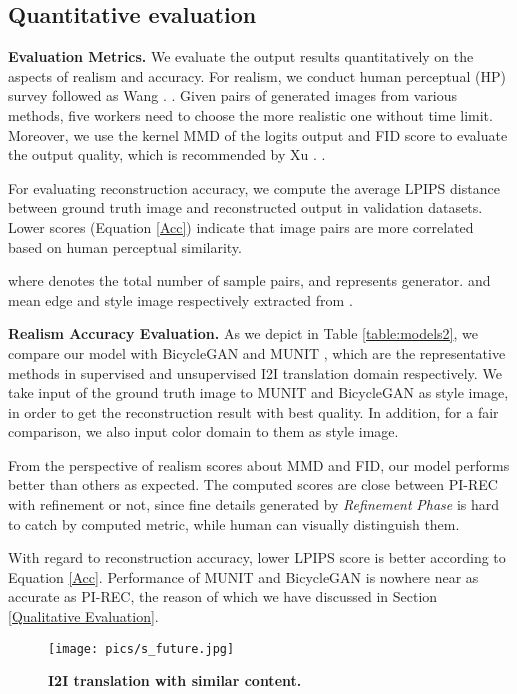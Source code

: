 \documentclass[10pt,twocolumn,letterpaper]{article} \usepackage{amsfonts,amssymb}
\begin{document}
\subsection{Quantitative evaluation} \label{Quantitative evaluation}
{\bf Evaluation Metrics.}
We evaluate the output results quantitatively on the aspects of realism and accuracy. For realism, we conduct human perceptual (HP) survey follow\-ed as Wang  . \cite{wang2018high}. Given pairs of generated images from various methods, five workers need to choose the more realistic one without time limit. Moreover, we use the kernel MMD \cite{gretton2007kernel} of the logits output and FID score \cite{heusel2017gans} to evaluate the output quality, which is recommended by Xu  . \cite{xu2018empirical}.

For evaluating reconstruction accuracy, we compute the average LPIPS distance \cite{zhang2018unreasonable} between ground truth image and reconstructed output in validation datasets. Lower scores (Equation \ref{Acc}) indicate that image pairs are more correlated based on human perceptual similarity.

where  denotes the total number of sample pairs, and  represents generator.  and  mean edge and style image respectively extracted from .

{\bf Realism  Accuracy Evaluation.}
As we depict in Table \ref{table:models2}, we compare our model with BicycleGAN \cite{zhu2017toward} and MUNIT \cite{huang2018multimodal}, which are the representative methods in supervised and unsupervised I2I translation domain respectively. We take input of the ground truth image to MUNIT and BicycleGAN as style image, in order to get the reconstruction result with best quality. In addition, for a fair comparison, we also input color domain to them as style image.

From the perspective of realism scores about MMD and FID, our model performs better than others as expected. The computed scores are close between PI-REC with refinement or not, since fine details generated by \emph{Refinement} \emph{Phase} is hard to catch by computed metric, while human can visually distinguish them.

With regard to reconstruction accuracy, lower LPIPS score is better according to Equation \ref{Acc}. Performance of MUNIT and BicycleGAN is nowhere near as accurate as PI-REC, the reason of which we have discussed in Section \ref{Qualitative Evaluation}.
\begin{figure}[h]
\centering



\texttt{[image: pics/s\_future.jpg]}

\caption{\textbf{I2I translation with similar content.}}
\label{future}
\end{figure}
\end{document}
